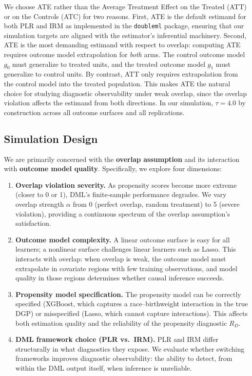 \documentclass[12pt]{article}
\begin{document}
We choose ATE rather than the Average Treatment Effect on the Treated (ATT) or on the Controls (ATC) for two reasons. First, ATE is the default estimand for both PLR and IRM as implemented in the \texttt{doubleml} package, ensuring that our simulation targets are aligned with the estimator's inferential machinery. Second, ATE is the most demanding estimand with respect to overlap: computing ATE requires outcome model extrapolation for \emph{both} arms. The control outcome model $g_0$ must generalize to treated units, and the treated outcome model $g_1$ must generalize to control units. By contrast, ATT only requires extrapolation from the control model into the treated population. This makes ATE the natural choice for studying diagnostic observability under weak overlap, since the overlap violation affects the estimand from both directions. In our simulation, $\tau = 4.0$ by construction across all outcome surfaces and all replications.

\subsection{Simulation Design}

We are primarily concerned with the \textbf{overlap assumption} and its interaction with \textbf{outcome model quality}. Specifically, we explore four dimensions:

\begin{enumerate}
  \item \textbf{Overlap violation severity.} As propensity scores become more extreme (closer to 0 or 1), DML's finite-sample performance degrades. We vary overlap strength $\alpha$ from 0 (perfect overlap, random treatment) to 5 (severe violation), providing a continuous spectrum of the overlap assumption's satisfaction.

  \item \textbf{Outcome model complexity.} A linear outcome surface is easy for all learners; a nonlinear surface challenges linear learners such as Lasso. This interacts with overlap: when overlap is weak, the outcome model must extrapolate in covariate regions with few training observations, and model quality in those regions determines whether causal inference succeeds.

  \item \textbf{Propensity model specification.} The propensity model can be correctly specified (XGBoost, which captures a race--birthweight interaction in the true DGP) or misspecified (Lasso, which cannot capture interactions). This affects both estimation quality and the reliability of the propensity diagnostic $R_D$.

  \item \textbf{DML framework choice (PLR vs.\ IRM).} PLR and IRM differ structurally in what diagnostics they expose. We evaluate whether switching frameworks improves diagnostic observability: the ability to detect, from within the DML output itself, when inference is unreliable.
\end{enumerate}
\end{document}
